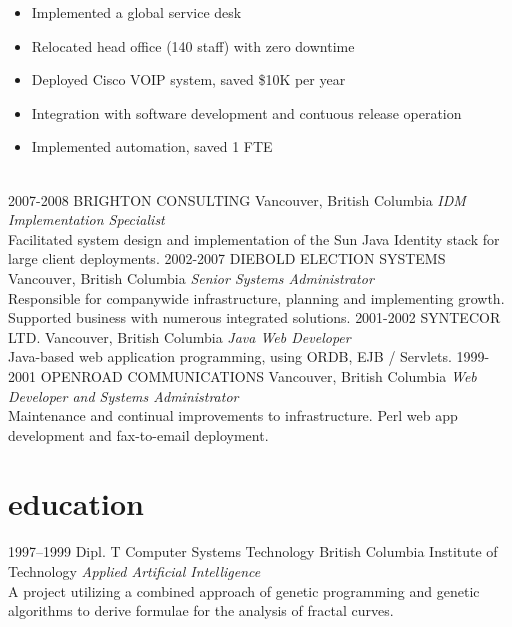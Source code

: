 \documentclass[]{friggeri-cv} %
\begin{document}
\begin{entrylist}
{\begin{itemize}
\item Implemented a global service desk
\item Relocated head office (140 staff) with zero downtime
\item Deployed Cisco VOIP system, saved \$10K per year
\item Integration with software development and contuous release operation
\item Implemented automation, saved 1 FTE
\end{itemize}}
\\
\entry
{2007-2008}
{BRIGHTON CONSULTING}
{Vancouver, British Columbia}
{\emph{IDM Implementation Specialist} \\
Facilitated system design and implementation of the Sun Java Identity stack for large client deployments.}
\entry
{2002-2007}
{DIEBOLD ELECTION SYSTEMS}
{Vancouver, British Columbia}
{\emph{Senior Systems Administrator} \\
Responsible for companywide infrastructure, planning and implementing growth. Supported business with numerous integrated solutions.}
\entry
{2001-2002}
{SYNTECOR LTD.}
{Vancouver, British Columbia}
{\emph{Java Web Developer} \\
Java-based web application programming, using ORDB, EJB / Servlets.}
\entry
{1999-2001}
{OPENROAD COMMUNICATIONS}
{Vancouver, British Columbia}
{\emph{Web Developer and Systems Administrator} \\
Maintenance and continual improvements to infrastructure. Perl web app development and fax-to-email deployment.}
\end{entrylist}


\section{education}

\begin{entrylist}
\entry
{1997--1999}
{Dipl. T {\normalfont Computer Systems Technology}}
{British Columbia Institute of Technology}
{\emph{Applied Artificial Intelligence} \\ A project utilizing a combined approach of genetic programming and genetic algorithms to derive formulae for the analysis of fractal curves.}
\end{entrylist}
\end{document}

